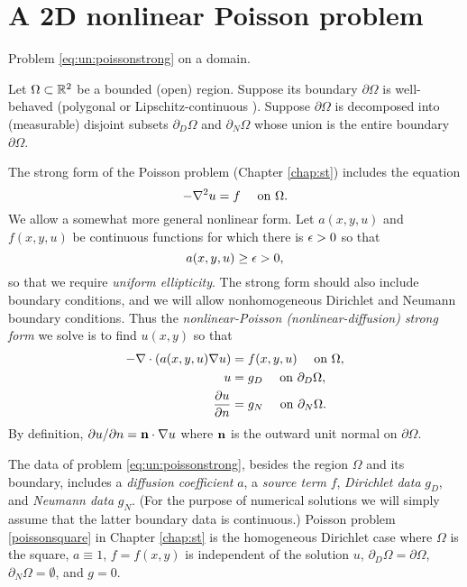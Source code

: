 \section{A 2D nonlinear Poisson problem}

\begin{marginfigure}

\caption{Problem \eqref{eq:un:poissonstrong} on a domain.}
\label{fig:un:generalpoissondomain}
\end{marginfigure}

Let $\Omega \subset \mathbb{R}^2$ be a bounded (open) region.  Suppose its boundary $\partial\Omega$ is well-behaved (polygonal or Lipschitz-continuous \citep[section 1.2]{Ciarlet2002}).  Suppose $\partial\Omega$ is decomposed into (measurable) disjoint subsets $\partial_D \Omega$ and $\partial_N \Omega$ whose union is the entire boundary $\partial \Omega$.

The strong form of the Poisson problem (Chapter \ref{chap:st}) includes the equation 
    $$- \nabla^2 u = f \quad \text{ on } \Omega.$$
We allow a somewhat more general nonlinear form.  Let $a(x,y,u)$ and $f(x,y,u)$ be continuous functions for which there is $\epsilon>0$ so that
    $$a(x,y,u) \ge \epsilon > 0,$$
so that we require \emph{uniform ellipticity}.  The strong form should also include boundary conditions, and we will allow nonhomogeneous Dirichlet and Neumann boundary conditions.  Thus the  \emph{nonlinear-Poisson (nonlinear-diffusion) strong form} we solve is to find $u(x,y)$ so that
\begin{align}
- \nabla\cdot \left(a(x,y,u) \nabla u\right) &= f(x,y,u) \quad \text{ on } \Omega, \label{eq:un:poissonstrong} \\
u &= g_D \quad \text{ on } \partial_D \Omega, \notag \\
\frac{\partial u}{\partial n} &= g_N \quad \text{ on } \partial_N \Omega. \notag
\end{align}
By definition, $\partial u/\partial n = \mathbf{n} \cdot \nabla u$ where $\mathbf{n}$ is the outward unit normal on $\partial \Omega$.

The data of problem \eqref{eq:un:poissonstrong}, besides the region $\Omega$ and its boundary, includes a \emph{diffusion coefficient} $a$, a \emph{source term} $f$, \emph{Dirichlet data} $g_D$, and \emph{Neumann data} $g_N$.  (For the purpose of numerical solutions we will simply assume that the latter boundary data is continuous.)  Poisson problem \eqref{poissonsquare} in Chapter \ref{chap:st} is the homogeneous Dirichlet case where $\Omega$ is the square, $a\equiv 1$, $f=f(x,y)$ is independent of the solution $u$, $\partial_D \Omega = \partial \Omega$, $\partial_N \Omega = \emptyset$, and $g=0$.

